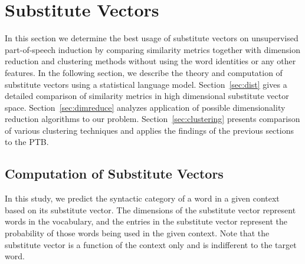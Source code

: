 \section{Substitute Vectors}
\label{sec:subthr}

In this section we determine the best usage of substitute vectors on
unsupervised part-of-speech induction by comparing similarity metrics
together with dimension reduction and clustering methods without using
the word identities or any other features.  In the following section,
we describe the theory and computation of substitute vectors using a
statistical language model.  Section~\ref{sec:dist} gives a detailed
comparison of similarity metrics in high dimensional substitute vector
space.  Section~\ref{sec:dimreduce} analyzes application of possible
dimensionality reduction algorithms to our problem.
Section~\ref{sec:clustering} presents comparison of various clustering
techniques and applies the findings of the previous sections to the
PTB.

\subsection{Computation of Substitute Vectors}
\label{sec:subcomp}

In this study, we predict the syntactic category of a word in a given
context based on its substitute vector.  The dimensions of the
substitute vector represent words in the vocabulary, and the entries
in the substitute vector represent the probability of those words
being used in the given context.  Note that the substitute vector is a
function of the context only and is indifferent to the target word.



